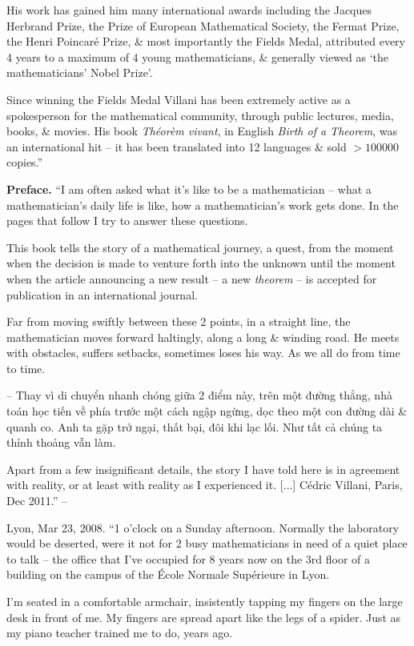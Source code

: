\documentclass{article}
\begin{document}
\begin{enumerate}
	His work has gained him many international awards including the Jacques Herbrand Prize, the Prize of European Mathematical Society, the Fermat Prize, the Henri Poincar\'e Prize, \& most importantly the Fields Medal, attributed every 4 years to a maximum of 4 young mathematicians, \& generally viewed as `the mathematicians' Nobel Prize'.
	
	Since winning the Fields Medal {\sc Villani} has been extremely active as a spokesperson for the mathematical community, through public lectures, media, books, \& movies. His book {\it Th\'eor\`em vivant}, in English {\it Birth of a Theorem}, was an international hit -- it has been translated into 12 languages \& sold $> 100000$ copies.''
	
	{\bf Preface.} ``I am often asked what it's like to be a mathematician -- what a mathematician's daily life is like, how a mathematician's work gets done. In the pages that follow I try to answer these questions.
	
	This book tells the story of a mathematical journey, a quest, from the moment when the decision is made to venture forth into the unknown until the moment when the article announcing a new result -- a new {\it theorem} -- is accepted for publication in an international journal.
	
	Far from moving swiftly between these 2 points, in a straight line, the mathematician moves forward haltingly, along a long \& winding road. He meets with obstacles, suffers setbacks, sometimes loses his way. As we all do from time to time.
	
	-- Thay vì di chuyển nhanh chóng giữa 2 điểm này, trên một đường thẳng, nhà toán học tiến về phía trước một cách ngập ngừng, dọc theo một con đường dài \& quanh co. Anh ta gặp trở ngại, thất bại, đôi khi lạc lối. Như tất cả chúng ta thỉnh thoảng vẫn làm.
	
	Apart from a few insignificant details, the story I have told here is in agreement with reality, or at least with reality as I experienced it. [$\ldots$] {\sc C\'edric Villani}, Paris, Dec 2011.'' -- \cite[p. 5]{Villani2015}
	
	 Lyon, Mar 23, 2008. ``1 o'clock on a Sunday afternoon. Normally the laboratory would be deserted, were it not for 2 busy mathematicians in need of a quiet place to talk -- the office that I've occupied for  8 years now on the 3rd floor of a building on the campus of the \'Ecole Normale Sup\'erieure in Lyon.
	
	I'm seated in a comfortable armchair, insistently tapping my fingers on the large desk in front of me. My fingers are spread apart like the legs of a spider. Just as my piano teacher trained me to do, years ago.
	

\end{enumerate}
\end{document}
